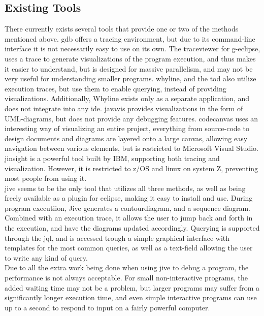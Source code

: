 \subsection{Existing Tools}\label{PreTools}
There currently exists several tools that provide one or two of the methods mentioned above.
\Gls{gdb} offers a tracing environment, but due to its command-line interface %
it is not necessarily easy to use on its own.
The \gls{traceviewer}\cite{Kranzlmuller} for g-eclipse, uses a trace to generate visualizations of the program execution, and thus makes it easier to understand, but is  designed for massive parallelism, and may not be very useful for understanding smaller programs.
\Gls{whyline}\cite{ko2009}, and the \gls{tod}\cite{Pothier2007} also utilize execution traces, but use them to enable querying, instead of providing visualizations.
Additionally, Whyline exists only as a separate application, and does not integrate into any \gls{ide}.
\Gls{javavis}\cite{Oechsle2002} provides visualizations in the form of UML-diagrams, but does not provide any debugging features.
\Gls{codecanvas} uses an interesting way of visualizing an entire project,  everything from source-code to design documents and diagrams  are layered onto a large canvas, allowing easy navigation between various elements, but is restricted to Microsoft Visual Studio.
\Gls{jinsight}\cite{Pauw} is a powerful tool  built by IBM, supporting both tracing and visualization.
However, it is restricted to z/OS and linux on system Z, preventing most people from using it.
~\\
\Gls{jive} seems to be the only tool that utilizes all three methods, as well as being freely available as a plugin for eclipse, making it easy to install and use.
During program executiion, Jive generates a \gls{contourdiagram}\cite{Jayaraman1996}, and a sequence diagram.
Combined with an execution trace, it allows the user to jump back and forth in the  execution, and have the diagrams updated accordingly.
Querying is supported through the \gls{jql}, and is accessed trough a simple graphical interface with templates for the most common queries, as well as a text-field allowing the user to write any kind of query.
~\\
Due to all the extra work being done when using jive to debug a program, the performance is not always acceptable.
For small non-interactive programs, the added waiting time may not be a problem, but larger programs may suffer from a significantly longer execution time, and even simple interactive programs can use up to a second to respond to input on a fairly powerful computer.
~\\





